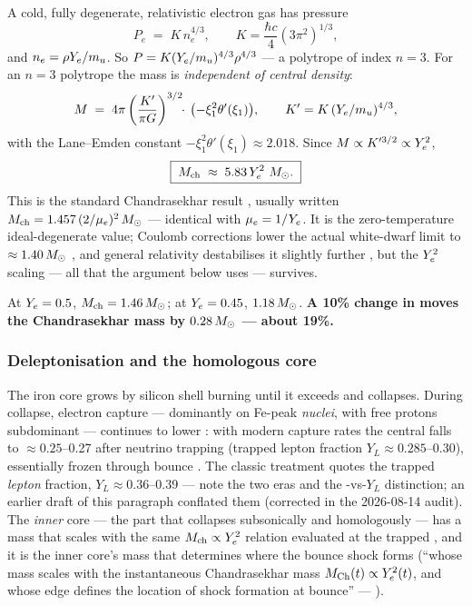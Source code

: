 A cold, fully degenerate, relativistic electron gas has pressure
%
\begin{equation}
P_e \;=\; K\,n_e^{4/3}, \qquad
K = \frac{\hbar c}{4}\left(3\pi^2\right)^{1/3},
\label{eq:degpressure}
\end{equation}
%
and $n_e = \rho Y_{e} / m_u$. So $P = K (Y_{e}/m_u)^{4/3} \rho^{4/3}$ --- a
polytrope of index $n = 3$. For an $n = 3$ polytrope the mass is
\emph{independent of central density}:
%
\begin{equation}
M \;=\; 4\pi\left(\frac{K'}{\pi G}\right)^{3/2}\!\!\cdot\,
        \bigl(-\xi_1^2\theta'(\xi_1)\bigr),
\qquad K' = K\,(Y_{e}/m_u)^{4/3},
\label{eq:polytropemass}
\end{equation}
%
with the Lane--Emden constant $-\xi_1^2\theta'(\xi_1) \approx 2.018$. Since
$M \propto K'^{3/2} \propto Y_{e}^2$,
%
\begin{equation}
\boxed{\;M_{\mathrm{ch}} \;\approx\; 5.83\,Y_{e}^2\ M_{\odot}.\;}
\label{eq:mch}
\end{equation}
%
This is the standard Chandrasekhar result \citep{chandrasekhar1931,
chandrasekhar1939}, usually written $M_{\mathrm{ch}} = 1.457\,(2/\mu_e)^2\,M_{\odot}$
\citep[eq.~3.3.17]{shapiro1983} --- identical with $\mu_e = 1/Y_{e}$. It is the
zero-temperature ideal-degenerate value; Coulomb corrections lower the actual
white-dwarf limit to $\approx 1.40\,M_{\odot}$ \citep{hamada1961}, and general
relativity destabilises it slightly further \citep[\S6.10]{shapiro1983}, but the
$Y_{e}^2$ scaling --- all that the argument below uses --- survives.

At $Y_{e} = 0.5$, $M_{\mathrm{ch}} = 1.46\,M_{\odot}$; at $Y_{e} = 0.45$, $1.18\,M_{\odot}$.
\textbf{A 10\% change in \Ye{} moves the Chandrasekhar mass by
$0.28\,M_{\odot}$ --- about 19\%.}\derivedhere

\subsubsection{Deleptonisation and the homologous core}
\label{sec:delepton}

The iron core grows by silicon shell burning until it exceeds \Mch{} and
collapses. During collapse, electron capture --- dominantly on Fe-peak
\emph{nuclei}, with free protons subdominant \citep{langanke2003, hix2003} ---
continues to lower \Ye: with modern capture rates the central \Ye{} falls to
$\approx 0.25$--0.27 after neutrino trapping (trapped lepton fraction
$Y_L \approx 0.285$--0.30), essentially frozen through bounce
\citep{janka2012}. The classic treatment \citep{bethe1990} quotes the trapped
\emph{lepton} fraction, $Y_L \approx 0.36$--0.39 --- note the two eras and the
\Ye-vs-$Y_L$ distinction; an earlier draft of this paragraph conflated them
(corrected in the 2026-08-14 audit). The \emph{inner} core --- the part that
collapses subsonically and homologously \citep{goldreich1980, yahil1983} --- has
a mass that scales with the same $M_{\mathrm{ch}} \propto Y_{e}^2$ relation evaluated at the
trapped \Ye, and it is the inner core's mass that determines where the bounce
shock forms (``whose mass scales with the instantaneous Chandrasekhar mass
$M_{\rm Ch}(t) \propto Y_{e}^2(t)$, and whose edge defines the location of shock
formation at bounce'' --- \citealp{janka2012}).

